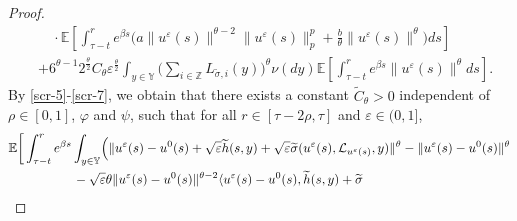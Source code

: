 \documentclass[11pt]{article}
\numberwithin{equation}{section}
\theoremstyle{plain}
\begin{document}
\begin{proof}
\begin{align}
	  & \quad 
	        \cdot \mathbb{E}
  	                  \left[ \int_{\tau-t}^{r} e^{\beta s}
	                               \Big( a \|u^{\varepsilon}(s)\|^{\theta-2} \|u^{\varepsilon}(s)\|_p^{p} 
	                                        + \frac{b}{\theta} \|u^{\varepsilon}(s)\|^{\theta}  
	                               \Big) ds
                   	  \right]  \nonumber\\
  	  & + 6^{\theta-1} 2^{\frac{\theta}{2}} C_{\theta} \varepsilon^{\frac{\theta}{2} }
	                   \int_{y \in \mathbb{Y} }
	                                \Big( \sum_{i \in \mathbb{Z}}
	                                               L_{\tilde{\sigma}, i}(y)
	                                \Big)^{\theta}
	                   \nu(dy)
	                   \mathbb{E}
	                          \left[ \int_{\tau-t}^{r} e^{\beta s} 
	                                             \|u^{\varepsilon}(s)\|^{\theta} 
	                                    ds
	                          \right].  	                     	                 	                     
 \end{align}
 By \eqref{scr-5}-\eqref{scr-7}, 
 we obtain that there exists a constant $\widetilde{C}_\theta > 0$ independent of $\rho \in [0,1]$, $\varphi$ and $\psi$, such that for all $r \in [\tau-2\rho, \tau]$ and $\varepsilon \in (0,1]$,     
 \begin{align} \label{scr-8}
       & \mathbb{E}
                    \bigg[ \int_{\tau-t}^{r} e^{\beta s}
                                 \int_{y \in \mathbb{Y} }
                                     \Bigl( \| u^{\varepsilon}(s) - u^0(s)
	                                              + \sqrt{\varepsilon}\widetilde{h}(s, y) 
	                                              + \sqrt{\varepsilon}
	                                                        \widetilde{\sigma}
	                                                              (u^{\varepsilon}(s), \mathcal{L}_{u^{\varepsilon}(s)}, y)
	                                           \|^{\theta}
      	                                       - \| u^{\varepsilon}(s) - u^0(s) \|^{\theta}  \nonumber\\
	   & \qquad\qquad\quad
	                                           - \sqrt{ \varepsilon} \theta 
	                                                                             \| u^{\varepsilon}(s) - u^0(s) \|^{\theta - 2}
	                                           \langle u^{\varepsilon}(s) - u^0(s),
	                                                        \widetilde{h}(s,y) 
	                                                        + \widetilde{\sigma}

\end{align}
\end{proof}
\end{document}
